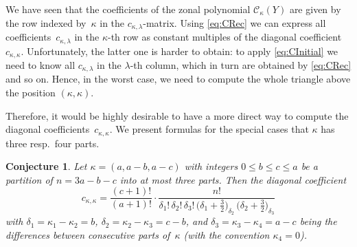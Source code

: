 \documentclass{mathincs}
\numberwithin{equation}{section}
\numberwithin{figure}{section}
\theoremstyle{plain}
\theoremstyle{definition}
\theoremstyle{remark}
\theoremstyle{plain}
\theoremstyle{definition}
\theoremstyle{plain}
\theoremstyle{plain}
\newtheorem{conj}[thm]{Conjecture}
\begin{document}
We have seen that the coefficients of the zonal polynomial $\mathcal{C}_\kappa(Y)$ are
given by the row indexed by~$\kappa$ in the $c_{\kappa,\lambda}$-matrix. Using
\eqref{eq:CRec} we can express all coefficients~$c_{\kappa,\lambda}$ in the
$\kappa$-th row as constant multiples of the diagonal
coefficient~$c_{\kappa,\kappa}$.  Unfortunately, the latter one is harder to
obtain: to apply \eqref{eq:CInitial} we need to know all $c_{\kappa,\lambda}$
in the $\lambda$-th column, which in turn are obtained by \eqref{eq:CRec} and
so on. Hence, in the worst case, we need to compute the whole triangle above
the position $(\kappa,\kappa)$.

Therefore, it would be highly desirable to have a more direct way to compute
the diagonal coefficients~$c_{\kappa,\kappa}$. We present formulas for the
special cases that $\kappa$ has three resp.\ four parts.

\begin{conj}\label{conj:diag3}
  Let $\kappa=(a,a-b,a-c)$ with integers $0\leq b\leq c\leq a$ be a partition
  of $n=3a-b-c$ into at most three parts. Then the diagonal coefficient
 \[ 
 c_{\kappa,\kappa}=\frac{(c+1)!}{(a+1)!} \cdot \frac{n!}{\delta_1! \, \delta_2! \, \delta_3! \,
     \bigl(\delta_1+\frac32\bigr)_{\!\delta_2} \, \bigl(\delta_2+\frac32\bigr)_{\!\delta_3}} 
 \] 
  with $\delta_1=\kappa_1-\kappa_2=b$, $\delta_2=\kappa_2-\kappa_3=c-b$, and
  $\delta_3=\kappa_3-\kappa_4=a-c$ being the differences between consecutive
  parts of~$\kappa$ (with the convention $\kappa_4=0$).
\end{conj}
\end{document}
